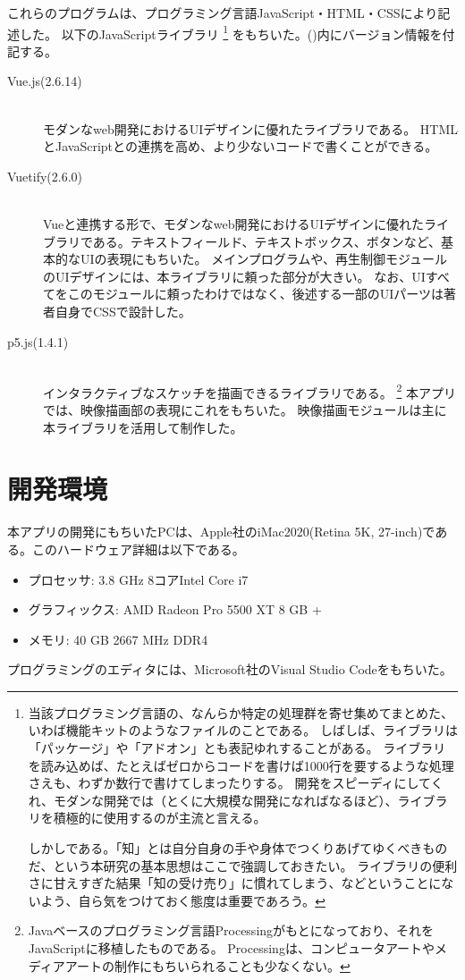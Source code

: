 これらのプログラムは、プログラミング言語JavaScript・HTML・CSSにより記述した。
以下のJavaScriptライブラリ
\footnote{\label{foot:ライブラリ}
  当該プログラミング言語の、なんらか特定の処理群を寄せ集めてまとめた、いわば機能キットのようなファイルのことである。
しばしば、ライブラリは「パッケージ」や「アドオン」とも表記ゆれすることがある。
ライブラリを読み込めば、たとえばゼロからコードを書けば1000行を要するような処理さえも、わずか数行で書けてしまったりする。
開発をスピーディにしてくれ、モダンな開発では（とくに大規模な開発になればなるほど）、ライブラリを積極的に使用するのが主流と言える。

しかしである。「知」とは自分自身の手や身体でつくりあげてゆくべきものだ、という本研究の基本思想はここで強調しておきたい。
ライブラリの便利さに甘えすぎた結果「知の受け売り」に慣れてしまう、などということにないよう、自ら気をつけておく態度は重要であろう。
}
をもちいた。()内にバージョン情報を付記する。
\begin{description}
  \item [Vue.js(2.6.14)]\mbox{}\\
    モダンなweb開発におけるUIデザインに優れたライブラリである。
    HTMLとJavaScriptとの連携を高め、より少ないコードで書くことができる。
  \item [Vuetify(2.6.0)]\mbox{}\\
    Vueと連携する形で、モダンなweb開発におけるUIデザインに優れたライブラリである。テキストフィールド、テキストボックス、ボタンなど、基本的なUIの表現にもちいた。
    メインプログラムや、再生制御モジュールのUIデザインには、本ライブラリに頼った部分が大きい。
    なお、UIすべてをこのモジュールに頼ったわけではなく、後述する一部のUIパーツは著者自身でCSSで設計した。
  \item [p5.js(1.4.1)]\mbox{}\\
    インタラクティブなスケッチを描画できるライブラリである。
    \footnote{Javaベースのプログラミング言語Processingがもとになっており、それをJavaScriptに移植したものである。
    Processingは、コンピュータアートやメディアアートの制作にもちいられることも少なくない。
    }
    本アプリでは、映像描画部の表現にこれをもちいた。\cite{p5}
    映像描画モジュールは主に本ライブラリを活用して制作した。
\end{description}

\section{開発環境}
本アプリの開発にもちいたPCは、Apple社のiMac2020(Retina 5K, 27-inch)である。このハードウェア詳細は以下である。
\begin{itemize}
  \item {プロセッサ: 3.8 GHz 8コアIntel Core i7}
  \item {グラフィックス: AMD Radeon Pro 5500 XT 8 GB + }
  \item {メモリ: 40 GB 2667 MHz DDR4}  
\end{itemize}
プログラミングのエディタには、Microsoft社のVisual Studio Code\cite{vscode}をもちいた。

